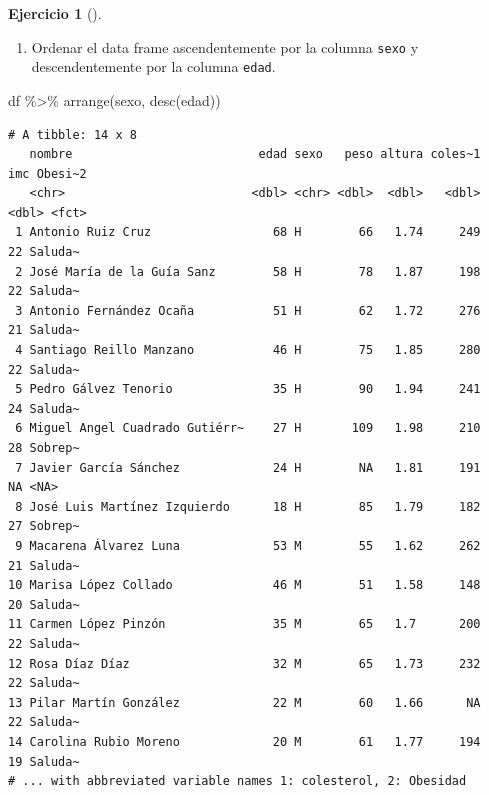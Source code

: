\documentclass[
  a4paper,
]{scrreport}
\newenvironment{Shaded}{\begin{snugshade}}{\end{snugshade}}
\newcommand{\FunctionTok}[1]{\textcolor[rgb]{0.28,0.35,0.67}{#1}}
\newcommand{\NormalTok}[1]{\textcolor[rgb]{0.00,0.23,0.31}{#1}}
\newcommand{\SpecialCharTok}[1]{\textcolor[rgb]{0.37,0.37,0.37}{#1}}
\providecommand{\tightlist}{%
  \setlength{\itemsep}{0pt}\setlength{\parskip}{0pt}}\usepackage{longtable,booktabs,array}
\theoremstyle{definition}
\newtheorem{exercise}{Ejercicio}[chapter]
\theoremstyle{remark}
\begin{document}
\begin{exercise}[]
\begin{tcolorbox}
\end{tcolorbox}

\begin{enumerate}
\def\labelenumi{\alph{enumi}.}
\setcounter{enumi}{10}
\tightlist
\item
  Ordenar el data frame ascendentemente por la columna \texttt{sexo} y
  descendentemente por la columna \texttt{edad}.
\end{enumerate}

\begin{tcolorbox}[enhanced jigsaw, coltitle=black, breakable, bottomtitle=1mm, colbacktitle=quarto-callout-tip-color!10!white, rightrule=.15mm, opacityback=0, opacitybacktitle=0.6, left=2mm, colframe=quarto-callout-tip-color-frame, title=\textcolor{quarto-callout-tip-color}{\faLightbulb}\hspace{0.5em}{Solución}, toprule=.15mm, toptitle=1mm, arc=.35mm, colback=white, titlerule=0mm, bottomrule=.15mm, leftrule=.75mm]

\begin{Shaded}
\begin{Highlighting}[]
\NormalTok{df }\SpecialCharTok{\%\textgreater{}\%}
    \FunctionTok{arrange}\NormalTok{(sexo, }\FunctionTok{desc}\NormalTok{(edad))}
\end{Highlighting}
\end{Shaded}

\begin{verbatim}
# A tibble: 14 x 8
   nombre                          edad sexo   peso altura coles~1   imc Obesi~2
   <chr>                          <dbl> <chr> <dbl>  <dbl>   <dbl> <dbl> <fct>  
 1 Antonio Ruiz Cruz                 68 H        66   1.74     249    22 Saluda~
 2 José María de la Guía Sanz        58 H        78   1.87     198    22 Saluda~
 3 Antonio Fernández Ocaña           51 H        62   1.72     276    21 Saluda~
 4 Santiago Reillo Manzano           46 H        75   1.85     280    22 Saluda~
 5 Pedro Gálvez Tenorio              35 H        90   1.94     241    24 Saluda~
 6 Miguel Angel Cuadrado Gutiérr~    27 H       109   1.98     210    28 Sobrep~
 7 Javier García Sánchez             24 H        NA   1.81     191    NA <NA>   
 8 José Luis Martínez Izquierdo      18 H        85   1.79     182    27 Sobrep~
 9 Macarena Álvarez Luna             53 M        55   1.62     262    21 Saluda~
10 Marisa López Collado              46 M        51   1.58     148    20 Saluda~
11 Carmen López Pinzón               35 M        65   1.7      200    22 Saluda~
12 Rosa Díaz Díaz                    32 M        65   1.73     232    22 Saluda~
13 Pilar Martín González             22 M        60   1.66      NA    22 Saluda~
14 Carolina Rubio Moreno             20 M        61   1.77     194    19 Saluda~
# ... with abbreviated variable names 1: colesterol, 2: Obesidad
\end{verbatim}

\end{tcolorbox}

\end{exercise}
\end{document}
